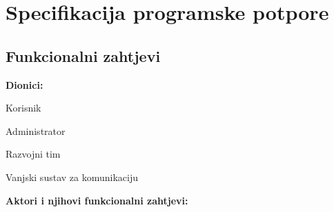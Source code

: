 \chapter{Specifikacija programske potpore}
		
	\section{Funkcionalni zahtjevi}

			\noindent \textbf{Dionici:}
			
			\begin{packed_enum}
				
				\item Korisnik
				\item Administrator				
				\item Razvojni tim
				\item Vanjski sustav za komunikaciju
				
			\end{packed_enum}
			
			\noindent \textbf{Aktori i njihovi funkcionalni zahtjevi:}
			
